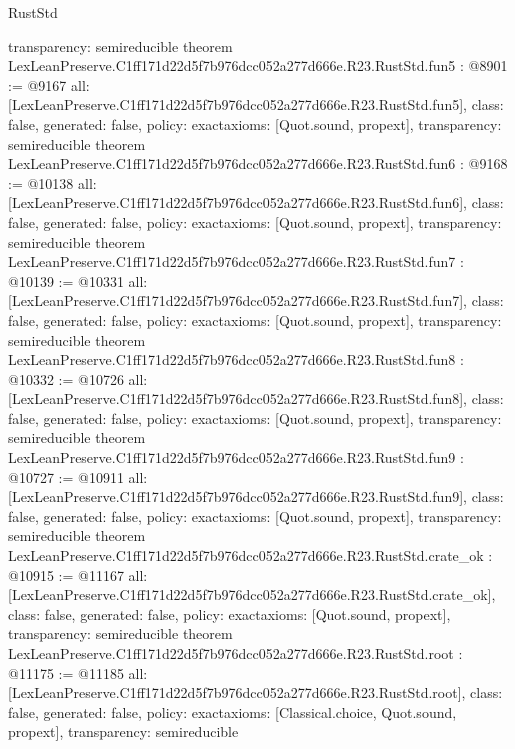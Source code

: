 \begin{lexlean}{RustStd}
\begin{coremodule}
{  transparency: semireducible
}
theorem LexLeanPreserve.C1ff171d22d5f7b976dcc052a277d666e.R23.RustStd.fun5 : @8901 := @9167 {
  all: [LexLeanPreserve.C1ff171d22d5f7b976dcc052a277d666e.R23.RustStd.fun5],
  class: false,
  generated: false,
  policy: exact{axioms: [Quot.sound, propext]},
  transparency: semireducible
}
theorem LexLeanPreserve.C1ff171d22d5f7b976dcc052a277d666e.R23.RustStd.fun6 : @9168 := @10138 {
  all: [LexLeanPreserve.C1ff171d22d5f7b976dcc052a277d666e.R23.RustStd.fun6],
  class: false,
  generated: false,
  policy: exact{axioms: [Quot.sound, propext]},
  transparency: semireducible
}
theorem LexLeanPreserve.C1ff171d22d5f7b976dcc052a277d666e.R23.RustStd.fun7 : @10139 := @10331 {
  all: [LexLeanPreserve.C1ff171d22d5f7b976dcc052a277d666e.R23.RustStd.fun7],
  class: false,
  generated: false,
  policy: exact{axioms: [Quot.sound, propext]},
  transparency: semireducible
}
theorem LexLeanPreserve.C1ff171d22d5f7b976dcc052a277d666e.R23.RustStd.fun8 : @10332 := @10726 {
  all: [LexLeanPreserve.C1ff171d22d5f7b976dcc052a277d666e.R23.RustStd.fun8],
  class: false,
  generated: false,
  policy: exact{axioms: [Quot.sound, propext]},
  transparency: semireducible
}
theorem LexLeanPreserve.C1ff171d22d5f7b976dcc052a277d666e.R23.RustStd.fun9 : @10727 := @10911 {
  all: [LexLeanPreserve.C1ff171d22d5f7b976dcc052a277d666e.R23.RustStd.fun9],
  class: false,
  generated: false,
  policy: exact{axioms: [Quot.sound, propext]},
  transparency: semireducible
}
theorem LexLeanPreserve.C1ff171d22d5f7b976dcc052a277d666e.R23.RustStd.crate_ok : @10915 := @11167 {
  all: [LexLeanPreserve.C1ff171d22d5f7b976dcc052a277d666e.R23.RustStd.crate_ok],
  class: false,
  generated: false,
  policy: exact{axioms: [Quot.sound, propext]},
  transparency: semireducible
}
theorem LexLeanPreserve.C1ff171d22d5f7b976dcc052a277d666e.R23.RustStd.root : @11175 := @11185 {
  all: [LexLeanPreserve.C1ff171d22d5f7b976dcc052a277d666e.R23.RustStd.root],
  class: false,
  generated: false,
  policy: exact{axioms: [Classical.choice, Quot.sound, propext]},
  transparency: semireducible
}


\end{coremodule}
\end{lexlean}
